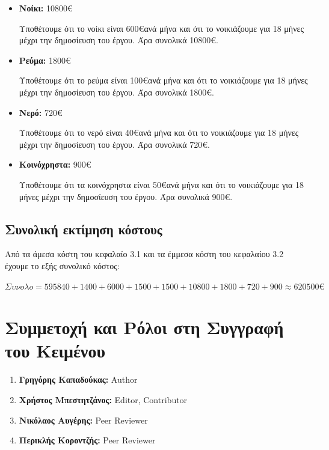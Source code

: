 \documentclass[12pt,a4paper]{article}
\begin{document}
\begin{itemize}
	\item \textbf{Νοίκι:} 10800\euro

		Υποθέτουμε ότι το νοίκι είναι 600\euro\space ανά μήνα και ότι το νοικιάζουμε για 18 μήνες μέχρι την δημοσίευση του έργου. Άρα συνολικά 10800\euro.

	\item \textbf{Ρεύμα:} 1800\euro

		Υποθέτουμε ότι το ρεύμα είναι 100\euro\space ανά μήνα και ότι το νοικιάζουμε για 18 μήνες μέχρι την δημοσίευση του έργου. Άρα συνολικά 1800\euro.

	\item \textbf{Νερό:} 720\euro

		Υποθέτουμε ότι το νερό είναι 40\euro\space ανά μήνα και ότι το νοικιάζουμε για 18 μήνες μέχρι την δημοσίευση του έργου. Άρα συνολικά 720\euro.

	\item \textbf{Κοινόχρηστα:} 900\euro

		Υποθέτουμε ότι τα κοινόχρηστα είναι 50\euro\space ανά μήνα και ότι το νοικιάζουμε για 18 μήνες μέχρι την δημοσίευση του έργου. Άρα συνολικά 900\euro.
\end{itemize}

\subsection{Συνολική εκτίμηση κόστους}

Από τα άμεσα κόστη του κεφαλαίο 3.1 και τα έμμεσα κόστη του κεφαλαίου 3.2 έχουμε το εξής συνολικό κόστος:

$Συνολο = 595840 + 1400 + 6000 + 1500 + 1500 + 10800 + 1800 + 720 + 900 \approx 620500\euro$

\section{Συμμετοχή και Ρόλοι στη Συγγραφή του Κειμένου}
\begin{enumerate}
	\item \textbf{Γρηγόρης Καπαδούκας:} Author
	\item \textbf{Χρήστος Μπεστητζάνος:} Editor, Contributor
	\item \textbf{Νικόλαος Αυγέρης:} Peer Reviewer
	\item \textbf{Περικλής Κοροντζής:} Peer Reviewer
\end{enumerate}
\end{document}

